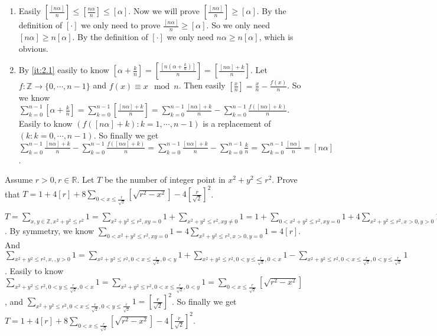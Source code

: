 \documentclass{ctexart}
\begin{document}
\begin{solution}
  \begin{enumerate}
    \item \label{it:2.1} Easily \(\left[\frac{[n \alpha]}{n}\right]\leq\left[\frac{n \alpha}{n}\right] \leq[\alpha]\).
      Now we will prove \(\left[\frac{[n \alpha]}{n}\right]\geq [\alpha]\).
      By the definition of \([\cdot]\) we only need to prove \(\frac{[n \alpha]}{n}\geq [\alpha]\).
      So we only need \([n \alpha]\geq n [\alpha]\).
      By the definition of \([\cdot]\) we only need \(n \alpha \geq n[\alpha]\), which is obvious.
    \item By \ref{it:2.1} easily to know \([\alpha+\frac{k}{n}]=\left[\frac{[n(\alpha+\frac{k}{n})]}{n}\right]=
      \left[\frac{[n \alpha]+k}{n}\right]\).
      Let \(f:\mathbb{Z} \to \{0,\cdots,n-1\}\) and \(f(x)\equiv x \mod n\).
      Then easily \([\frac{x}{n}]=\frac{x}{n}-\frac{f(x)}{n}\).
      So we know \(\sum_{k=0}^{n-1}[\alpha+\frac{k}{n}]=\sum_{k=0}^{n-1}[\frac{[n \alpha]+k}{n}]=
      \sum_{k=0}^{n-1}\frac{[n \alpha]+k}{n}-\sum_{k=0}^{n-1}\frac{f([n \alpha]+k)}{n}\).
      Easily to know \((f([n \alpha]+k):k=1,\cdots,n-1)\) is a replacement of \((k:k=0,\cdots,n-1)\).
      So finally we get \(\sum_{k=0}^{n-1}\frac{[n \alpha]+k}{n}-\sum_{k=0}^{n-1}\frac{f([n \alpha]+k)}{n}=\sum_{k=0}^{n-1}\frac{[n \alpha]+k}{n}-\sum_{k=0}^{n-1}\frac{k}{n}=\sum_{k=0}^{n-1}\frac{[n \alpha]}{n}=[n \alpha]\).
  \end{enumerate}
\end{solution}
\begin{problem}\label{pro:p16.4.3}
  Assume \(r>0,r \in \mathbb{R}\). Let \(T\) be the number of integer point in  \(x^2 + y^2 \leq r^2\).
  Prove that \(T = 1 + 4[r] + 8 \sum_{0<x \leq \frac{r}{\sqrt{2}}}[\sqrt{r^2-x^2}] -4\left[\frac{r}{\sqrt{2}}\right]^2\).
\end{problem}
\begin{solution}
  \(T=\sum_{x,y \in \mathbb{Z},x^2 + y^2 \leq r^2}1=\sum_{x^2 + y^2 \leq r^2,xy=0} 1 +\sum_{x^2+y^2 \leq r^2,xy \neq 0} 1=
  1+\sum_{0<x^2 + y^2 \leq r^2,xy=0} 1 +4 \sum_{x^2 + y^2 \leq r^2,x>0,y>0} 1\).
  By symmetry, we know \(\sum_{0<x^2 + y^2 \leq r^2,xy=0} 1 =4\sum_{x^2 + y^2 \leq r^2,x >0,y=0} 1=4[r]\).
  And \(\sum_{x^2 + y^2 \leq r^2,x,,y>0} 1 =\sum_{x^2+y^2 \leq r^2,0<x \leq \frac{r}{\sqrt{2}},0<y} 1 + \sum_{x^2+y^2 \leq r^2,0<y \leq \frac{r}{\sqrt{2}},0<x} 1 -\sum_{x^2+y^2 \leq r^2,0<x \leq \frac{r}{\sqrt{2}},0<y \leq \frac{r}{\sqrt{2}}} 1\).
  Easily to know \(\sum_{x^2+y^2 \leq r^2,0<y \leq \frac{r}{\sqrt{2}},0<x} 1 =\sum_{x^2+y^2 \leq r^2,0<x \leq \frac{r}{\sqrt{2}},0<y} 1 =\sum_{0<x \leq \frac{r}{\sqrt{2}}}[\sqrt{r^2-x^2}]\),
  and \(\sum_{x^2+y^2 \leq r^2,0<x \leq \frac{r}{\sqrt{2}},0<y \leq \frac{r}{\sqrt{2}}} 1=\left[\frac{r}{\sqrt{2}}\right]^2\).
  So finally we get \(T = 1 + 4[r] + 8 \sum_{0<x \leq \frac{r}{\sqrt{2}}}[\sqrt{r^2-x^2}] -4\left[\frac{r}{\sqrt{2}}\right]^2\).
\end{solution}
\end{document}
